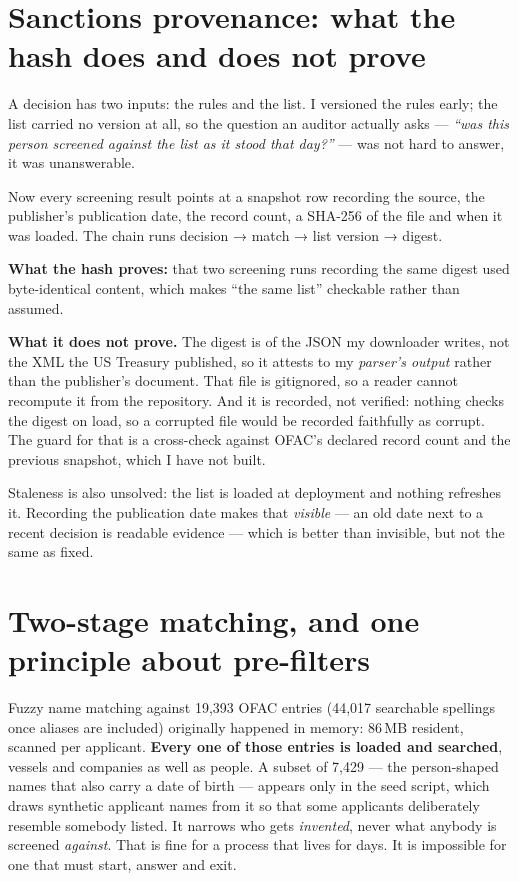 \documentclass[11pt,a4paper]{article}
\begin{document}
\section{Sanctions provenance: what the hash does and does not prove}

A decision has two inputs: the rules and the list. I versioned the rules early;
the list carried no version at all, so the question an auditor actually asks ---
\emph{``was this person screened against the list as it stood that day?''} --- was
not hard to answer, it was unanswerable.

Now every screening result points at a snapshot row recording the source, the
publisher's publication date, the record count, a SHA-256 of the file and when it
was loaded. The chain runs decision → match → list version → digest.

\textbf{What the hash proves:} that two screening runs recording the same digest
used byte-identical content, which makes ``the same list'' checkable rather than
assumed.

\textbf{What it does not prove.} The digest is of the JSON my downloader writes,
not the XML the US Treasury published, so it attests to my \emph{parser's
output} rather than the publisher's document. That file is gitignored, so a
reader cannot recompute it from the repository. And it is recorded, not
verified: nothing checks the digest on load, so a corrupted file would be
recorded faithfully as corrupt. The guard for that is a cross-check against
OFAC's declared record count and the previous snapshot, which I have not
built.

Staleness is also unsolved: the list is loaded at deployment and nothing refreshes
it. Recording the publication date makes that \emph{visible} --- an old date next
to a recent decision is readable evidence --- which is better than invisible, but
not the same as fixed.

\section{Two-stage matching, and one principle about pre-filters}

Fuzzy name matching against 19{,}393 OFAC entries (44{,}017 searchable spellings
once aliases are included) originally happened in memory: 86\,MB resident,
scanned per applicant. \textbf{Every one of those entries is loaded and
searched}, vessels and companies as well as people. A subset of 7{,}429 --- the
person-shaped names that also carry a date of birth --- appears only in the seed
script, which draws synthetic applicant names from it so that some applicants
deliberately resemble somebody listed. It narrows who gets \emph{invented},
never what anybody is screened \emph{against}.
That is fine for a process that lives for days. It is
impossible for one that must start, answer and exit.
\end{document}
